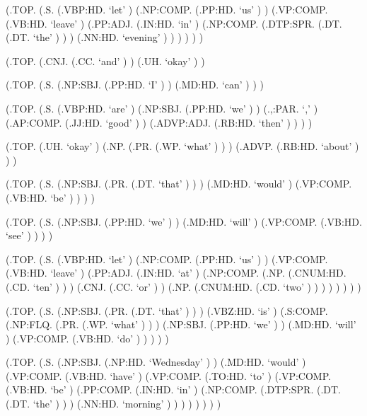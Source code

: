 \documentclass[10pt]{article}
\begin{document}
\begin{parsetree}  (.TOP. (.S. (.VBP:HD. `let' ) (.NP:COMP. (.PP:HD. `us' ) ) (.VP:COMP. (.VB:HD. `leave' ) (.PP:ADJ. (.IN:HD. `in' ) (.NP:COMP. (.DTP:SPR. (.DT. (.DT. `the' ) ) ) (.NN:HD. `evening' ) ) ) ) ) ) \end{parsetree}

\begin{parsetree}  (.TOP. (.CNJ. (.CC. `and' ) ) (.UH. `okay' ) ) \end{parsetree}

\begin{parsetree}  (.TOP. (.S. (.NP:SBJ. (.PP:HD. `I' ) ) (.MD:HD. `can' ) ) ) \end{parsetree}

\begin{parsetree}  (.TOP. (.S. (.VBP:HD. `are' ) (.NP:SBJ. (.PP:HD. `we' ) ) (.,:PAR. `,' ) (.AP:COMP. (.JJ:HD. `good' ) ) (.ADVP:ADJ. (.RB:HD. `then' ) ) ) ) \end{parsetree}

\begin{parsetree}  (.TOP. (.UH. `okay' ) (.NP. (.PR. (.WP. `what' ) ) ) (.ADVP. (.RB:HD. `about' ) ) ) \end{parsetree}

\begin{parsetree}  (.TOP. (.S. (.NP:SBJ. (.PR. (.DT. `that' ) ) ) (.MD:HD. `would' ) (.VP:COMP. (.VB:HD. `be' ) ) ) ) \end{parsetree}

\begin{parsetree}  (.TOP. (.S. (.NP:SBJ. (.PP:HD. `we' ) ) (.MD:HD. `will' ) (.VP:COMP. (.VB:HD. `see' ) ) ) ) \end{parsetree}

\begin{parsetree}  (.TOP. (.S. (.VBP:HD. `let' ) (.NP:COMP. (.PP:HD. `us' ) ) (.VP:COMP. (.VB:HD. `leave' ) (.PP:ADJ. (.IN:HD. `at' ) (.NP:COMP. (.NP. (.CNUM:HD. (.CD. `ten' ) ) ) (.CNJ. (.CC. `or' ) ) (.NP. (.CNUM:HD. (.CD. `two' ) ) ) ) ) ) ) ) \end{parsetree}

\begin{parsetree}  (.TOP. (.S. (.NP:SBJ. (.PR. (.DT. `that' ) ) ) (.VBZ:HD. `is' ) (.S:COMP. (.NP:FLQ. (.PR. (.WP. `what' ) ) ) (.NP:SBJ. (.PP:HD. `we' ) ) (.MD:HD. `will' ) (.VP:COMP. (.VB:HD. `do' ) ) ) ) ) \end{parsetree}

\begin{parsetree}  (.TOP. (.S. (.NP:SBJ. (.NP:HD. `Wednesday' ) ) (.MD:HD. `would' ) (.VP:COMP. (.VB:HD. `have' ) (.VP:COMP. (.TO:HD. `to' ) (.VP:COMP. (.VB:HD. `be' ) (.PP:COMP. (.IN:HD. `in' ) (.NP:COMP. (.DTP:SPR. (.DT. (.DT. `the' ) ) ) (.NN:HD. `morning' ) ) ) ) ) ) ) ) \end{parsetree}
\end{document}
